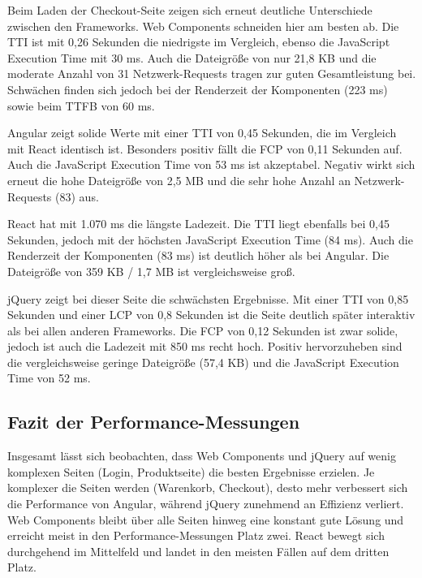 \documentclass[oneside]{ausarbeitung}
\begin{document}
Beim Laden der Checkout-Seite zeigen sich erneut deutliche Unterschiede zwischen den Frameworks. Web Components schneiden hier am besten ab. Die TTI ist mit 0,26 Sekunden die niedrigste im Vergleich, ebenso die JavaScript Execution Time mit 30 ms. Auch die Dateigröße von nur 21,8 KB und die moderate Anzahl von 31 Netzwerk-Requests tragen zur guten Gesamtleistung bei. Schwächen finden sich jedoch bei der Renderzeit der Komponenten (223 ms) sowie beim TTFB von 60 ms.

Angular zeigt solide Werte mit einer TTI von 0,45 Sekunden, die im Vergleich mit React identisch ist. Besonders positiv fällt die FCP von 0,11 Sekunden auf. Auch die JavaScript Execution Time von 53 ms ist akzeptabel. Negativ wirkt sich erneut die hohe Dateigröße von 2,5 MB und die sehr hohe Anzahl an Netzwerk-Requests (83) aus.

React hat mit 1.070 ms die längste Ladezeit. Die TTI liegt ebenfalls bei 0,45 Sekunden, jedoch mit der höchsten JavaScript Execution Time (84 ms). Auch die Renderzeit der Komponenten (83 ms) ist deutlich höher als bei Angular. Die Dateigröße von 359 KB / 1,7 MB ist vergleichsweise groß.

jQuery zeigt bei dieser Seite die schwächsten Ergebnisse. Mit einer TTI von 0,85 Sekunden und einer LCP von 0,8 Sekunden ist die Seite deutlich später interaktiv als bei allen anderen Frameworks. Die FCP von 0,12 Sekunden ist zwar solide, jedoch ist auch die Ladezeit mit 850 ms recht hoch. Positiv hervorzuheben sind die vergleichsweise geringe Dateigröße (57,4 KB) und die JavaScript Execution Time von 52 ms.

\subsection{Fazit der Performance-Messungen}

Insgesamt lässt sich beobachten, dass Web Components und jQuery auf wenig komplexen Seiten (Login, Produktseite) die besten Ergebnisse erzielen. Je komplexer die Seiten werden (Warenkorb, Checkout), desto mehr verbessert sich die Performance von Angular, während jQuery zunehmend an Effizienz verliert. Web Components bleibt über alle Seiten hinweg eine konstant gute Lösung und erreicht meist in den Performance-Messungen Platz zwei. React bewegt sich durchgehend im Mittelfeld und landet in den meisten Fällen auf dem dritten Platz.
\end{document}
